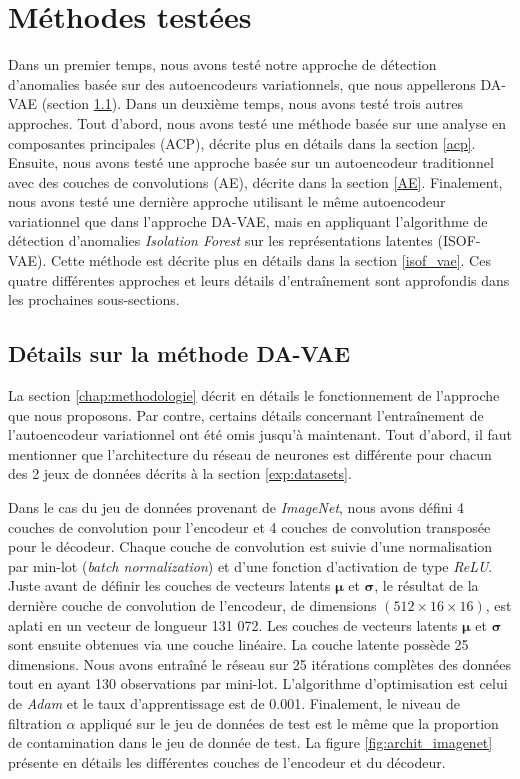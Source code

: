 \section{Méthodes testées} \label{exp:methods}

Dans un premier temps, nous avons testé notre approche de détection d'anomalies basée sur des autoencodeurs variationnels, que nous appellerons DA-VAE (section \ref{DA_VAE}). Dans un deuxième temps, nous avons testé trois autres approches. Tout d'abord, nous avons testé une méthode basée sur une analyse en composantes principales (ACP), décrite plus en détails dans la section \ref{acp}. Ensuite, nous avons testé une approche basée sur un autoencodeur traditionnel avec des couches de convolutions (AE), décrite dans la section \ref{AE}. Finalement, nous avons testé une dernière approche utilisant le même autoencodeur variationnel que dans l'approche DA-VAE, mais en appliquant l'algorithme de détection d'anomalies \textit{Isolation Forest} \citep{4781136} sur les représentations latentes (ISOF-VAE). Cette méthode est décrite plus en détails dans la section \ref{isof_vae}. Ces quatre différentes approches et leurs détails d'entraînement sont approfondis dans les prochaines sous-sections.

\subsection{Détails sur la méthode DA-VAE} \label{DA_VAE}

La section \ref{chap:methodologie} décrit en détails le fonctionnement de l'approche que nous proposons. Par contre, certains détails concernant l'entraînement de l'autoencodeur variationnel ont été omis jusqu'à maintenant. Tout d'abord, il faut mentionner que l'architecture du réseau de neurones est différente pour chacun des 2 jeux de données décrits à la section \ref{exp:datasets}.

Dans le cas du jeu de données provenant de \textit{ImageNet}, nous avons défini 4 couches de convolution pour l'encodeur et 4 couches de convolution transposée pour le décodeur. Chaque couche de convolution est suivie d'une normalisation par min-lot (\textit{batch normalization}) et d'une fonction d'activation de type \textit{ReLU}. Juste avant de définir les couches de vecteurs latents $\boldsymbol{\mu}$ et $\boldsymbol{\sigma}$, le résultat de la dernière couche de convolution de l'encodeur, de dimensions $(512 \times 16 \times 16)$, est aplati en un vecteur de longueur 131 072. Les couches de vecteurs latents $\boldsymbol{\mu}$ et $\boldsymbol{\sigma}$ sont ensuite obtenues via une couche linéaire. La couche latente possède 25 dimensions. Nous avons entraîné le réseau sur 25 itérations complètes des données tout en ayant 130 observations par mini-lot. L'algorithme d'optimisation est celui de \textit{Adam} \citep{kingma2014method} et le taux d'apprentissage est de 0.001. Finalement, le niveau de filtration $\alpha$ appliqué sur le jeu de données de test est le même que la proportion de contamination dans le jeu de donnée de test. La figure \ref{fig:archit_imagenet} présente en détails les différentes couches de l'encodeur et du décodeur.

